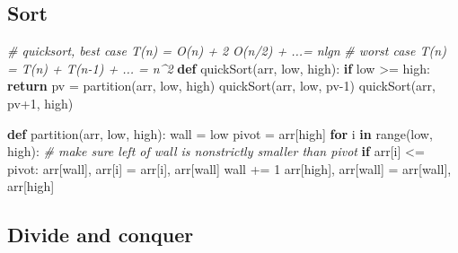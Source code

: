 \documentclass[
]{article}
\newenvironment{Shaded}{}{}
\newcommand{\BuiltInTok}[1]{#1}
\newcommand{\CommentTok}[1]{\textcolor[rgb]{0.38,0.63,0.69}{\textit{#1}}}
\newcommand{\ControlFlowTok}[1]{\textcolor[rgb]{0.00,0.44,0.13}{\textbf{#1}}}
\newcommand{\DecValTok}[1]{\textcolor[rgb]{0.25,0.63,0.44}{#1}}
\newcommand{\KeywordTok}[1]{\textcolor[rgb]{0.00,0.44,0.13}{\textbf{#1}}}
\newcommand{\NormalTok}[1]{#1}
\newcommand{\OperatorTok}[1]{\textcolor[rgb]{0.40,0.40,0.40}{#1}}
\begin{document}
\hypertarget{sort}{%
\subsection{Sort}\label{sort}}

\begin{Shaded}
\begin{Highlighting}[]
\CommentTok{\# quicksort, best case T(n) = O(n) + 2 O(n/2) + ...= nlgn}
\CommentTok{\# worst case T(n) = T(n) + T(n{-}1) + ... = n\^{}2}
\KeywordTok{def}\NormalTok{ quickSort(arr, low, high):}
    \ControlFlowTok{if}\NormalTok{ low }\OperatorTok{\textgreater{}=}\NormalTok{ high: }\ControlFlowTok{return}
\NormalTok{    pv }\OperatorTok{=}\NormalTok{ partition(arr, low, high)}
\NormalTok{    quickSort(arr, low, pv}\OperatorTok{{-}}\DecValTok{1}\NormalTok{)}
\NormalTok{    quickSort(arr, pv}\OperatorTok{+}\DecValTok{1}\NormalTok{, high)}

\KeywordTok{def}\NormalTok{ partition(arr, low, high):}
\NormalTok{    wall }\OperatorTok{=}\NormalTok{ low}
\NormalTok{    pivot }\OperatorTok{=}\NormalTok{ arr[high]}
    \ControlFlowTok{for}\NormalTok{ i }\KeywordTok{in} \BuiltInTok{range}\NormalTok{(low, high):}
        \CommentTok{\# make sure left of wall is nonstrictly smaller than pivot}
        \ControlFlowTok{if}\NormalTok{ arr[i] }\OperatorTok{\textless{}=}\NormalTok{ pivot:}
\NormalTok{            arr[wall], arr[i] }\OperatorTok{=}\NormalTok{ arr[i], arr[wall]}
\NormalTok{            wall }\OperatorTok{+=} \DecValTok{1}
\NormalTok{    arr[high], arr[wall] }\OperatorTok{=}\NormalTok{ arr[wall], arr[high]}
\end{Highlighting}
\end{Shaded}

\hypertarget{divide-and-conquer}{%
\subsection{Divide and conquer}\label{divide-and-conquer}}
\end{document}
